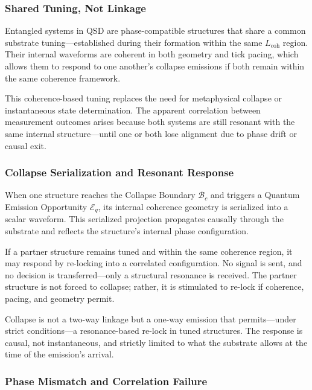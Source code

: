 \documentclass[preprints,article,submit,pdftex,moreauthors]{Definitions/mdpi}
\begin{document}
\subsubsection{Shared Tuning, Not Linkage}

Entangled systems in QSD are phase-compatible structures that share a common substrate tuning—established during their formation within the same \( L_{\text{coh}} \) region. Their internal waveforms are coherent in both geometry and tick pacing, which allows them to respond to one another’s collapse emissions if both remain within the same coherence framework.

This coherence-based tuning replaces the need for metaphysical collapse or instantaneous state determination. The apparent correlation between measurement outcomes arises because both systems are still resonant with the same internal structure—until one or both lose alignment due to phase drift or causal exit.

\subsubsection{Collapse Serialization and Resonant Response}

When one structure reaches the Collapse Boundary \( \mathcal{B}_c \) and triggers a Quantum Emission Opportunity \( \mathcal{E}_q \), its internal coherence geometry is serialized into a scalar waveform. This serialized projection propagates causally through the substrate and reflects the structure's internal phase configuration.

If a partner structure remains tuned and within the same coherence region, it may respond by re-locking into a correlated configuration. No signal is sent, and no decision is transferred—only a structural resonance is received. The partner structure is not forced to collapse; rather, it is stimulated to re-lock if coherence, pacing, and geometry permit.

Collapse is not a two-way linkage but a one-way emission that permits—under strict conditions—a resonance-based re-lock in tuned structures. The response is causal, not instantaneous, and strictly limited to what the substrate allows at the time of the emission’s arrival.

\subsubsection{Phase Mismatch and Correlation Failure}
\end{document}
